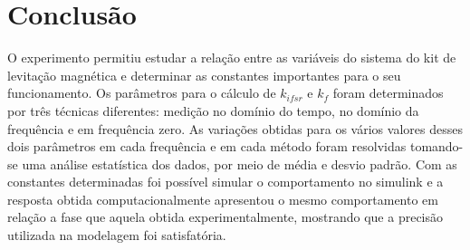\section{Conclusão}
O experimento permitiu estudar a relação entre as variáveis do sistema
do kit de levitação magnética e determinar as constantes importantes para o seu funcionamento. Os parâmetros para o cálculo de $k_{ifsr}$ e $k_f$ foram determinados por três técnicas diferentes: medição no domínio do tempo, no domínio da frequência e em frequência zero. As variações obtidas para os vários valores desses dois parâmetros em cada frequência e em cada método foram resolvidas tomando-se uma análise estatística dos dados, por meio de média e desvio padrão. Com as constantes determinadas foi possível
simular o comportamento no simulink e a resposta obtida computacionalmente apresentou o mesmo comportamento em relação a fase que aquela obtida experimentalmente, mostrando que a precisão utilizada na modelagem foi satisfatória. 